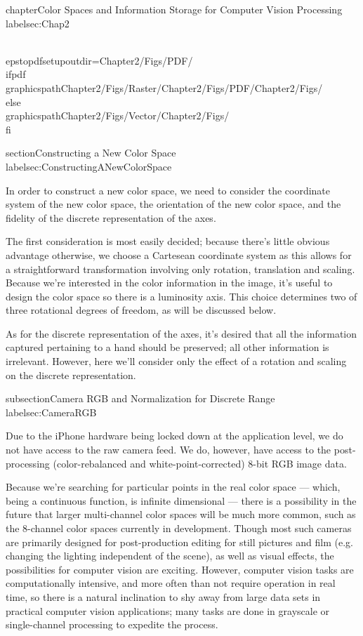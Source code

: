 
chapter{Color Spaces and Information Storage for Computer Vision Processing} \\label{sec:Chap2}

\\epstopdfsetup{outdir=Chapter2/Figs/PDF/}
\\ifpdf
    \\graphicspath{{Chapter2/Figs/Raster/}{Chapter2/Figs/PDF/}{Chapter2/Figs/}}
\\else
    \\graphicspath{{Chapter2/Figs/Vector/}{Chapter2/Figs/}}
\\fi


section{Constructing a New Color Space}\\label{sec:ConstructingANewColorSpace}

In order to construct a new color space, we need to consider the coordinate system of the new color space, the orientation of the new color space, and the fidelity of the discrete representation of the axes.

The first consideration is most easily decided; because there's little obvious advantage otherwise, we choose a Cartesean coordinate system as this allows for a straightforward transformation involving only rotation, translation and scaling. Because we're interested in the color information in the image, it's useful to design the color space so there is a luminosity axis. This choice determines two of three rotational degrees of freedom, as will be discussed below.

As for the discrete representation of the axes, it's desired that all the information captured pertaining to a hand should be preserved; all other information is irrelevant. However, here we'll consider only the effect of a rotation and scaling on the discrete representation.


subsection{Camera RGB and Normalization for Discrete Range}\\label{sec:CameraRGB}

Due to the iPhone hardware being locked down at the application level, we do not have access to the raw camera feed. We do, however, have access to the post-processing (color-rebalanced and white-point-corrected) 8-bit RGB image data.

Because we're searching for particular points in the real color space --- which, being a continuous function, is infinite dimensional --- there is a possibility in the future that larger multi-channel color spaces will be much more common, such as the 8-channel color spaces currently in development. Though most such cameras are primarily designed for post-production editing for still pictures and film (e.g. changing the lighting independent of the scene), as well as visual effects, the possibilities for computer vision are exciting. However, computer vision tasks are computationally intensive, and more often than not require operation in real time, so there is a natural inclination to shy away from large data sets in practical computer vision applications; many tasks are done in grayscale or single-channel processing to expedite the process.

